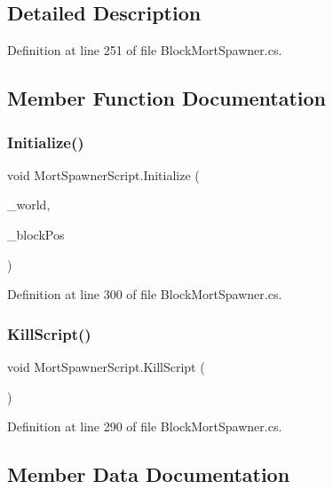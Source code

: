 \subsection{Detailed Description}


Definition at line 251 of file Block\+Mort\+Spawner.\+cs.



\subsection{Member Function Documentation}
\mbox{\label{class_mort_spawner_script_a6b9fd10724d483ddf05dc342cad37891}} 
\subsubsection{\texorpdfstring{Initialize()}{Initialize()}}
{\footnotesize\ttfamily void Mort\+Spawner\+Script.\+Initialize (\begin{DoxyParamCaption}\item[{World\+Base}]{\+\_\+world,  }\item[{Vector3i}]{\+\_\+block\+Pos }\end{DoxyParamCaption})}



Definition at line 300 of file Block\+Mort\+Spawner.\+cs.

\mbox{\label{class_mort_spawner_script_abbdcbd5b022cdc08814b203cef65dfa1}} 
\subsubsection{\texorpdfstring{KillScript()}{KillScript()}}
{\footnotesize\ttfamily void Mort\+Spawner\+Script.\+Kill\+Script (\begin{DoxyParamCaption}{ }\end{DoxyParamCaption})}



Definition at line 290 of file Block\+Mort\+Spawner.\+cs.



\subsection{Member Data Documentation}
\mbox{\label{class_mort_spawner_script_a2208d8bc8cf97de90898e69c4486ec90}} 
